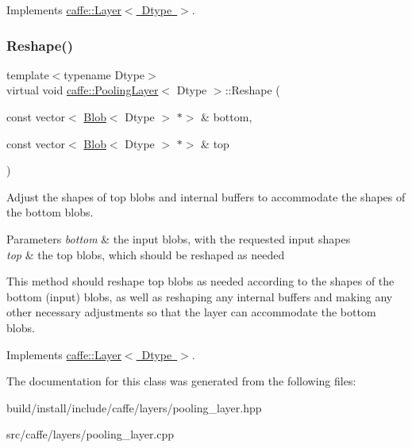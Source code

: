 Implements \mbox{\hyperlink{classcaffe_1_1_layer_a7fe981e8af8d93d587acf2a952be563d}{caffe\+::\+Layer$<$ Dtype $>$}}.

\mbox{\label{classcaffe_1_1_pooling_layer_ad8ab4e6541bc0954146d62781aeb1af8}} 
\subsubsection{\texorpdfstring{Reshape()}{Reshape()}\hspace{0.1cm}{\footnotesize\ttfamily [2/2]}}
{\footnotesize\ttfamily template$<$typename Dtype$>$ \\
virtual void \mbox{\hyperlink{classcaffe_1_1_pooling_layer}{caffe\+::\+Pooling\+Layer}}$<$ Dtype $>$\+::Reshape (\begin{DoxyParamCaption}\item[{const vector$<$ \mbox{\hyperlink{classcaffe_1_1_blob}{Blob}}$<$ Dtype $>$ $\ast$$>$ \&}]{bottom,  }\item[{const vector$<$ \mbox{\hyperlink{classcaffe_1_1_blob}{Blob}}$<$ Dtype $>$ $\ast$$>$ \&}]{top }\end{DoxyParamCaption})\hspace{0.3cm}{\ttfamily [virtual]}}



Adjust the shapes of top blobs and internal buffers to accommodate the shapes of the bottom blobs. 


\begin{DoxyParams}{Parameters}
{\em bottom} & the input blobs, with the requested input shapes \\
\hline
{\em top} & the top blobs, which should be reshaped as needed\\
\hline
\end{DoxyParams}
This method should reshape top blobs as needed according to the shapes of the bottom (input) blobs, as well as reshaping any internal buffers and making any other necessary adjustments so that the layer can accommodate the bottom blobs. 

Implements \mbox{\hyperlink{classcaffe_1_1_layer_a7fe981e8af8d93d587acf2a952be563d}{caffe\+::\+Layer$<$ Dtype $>$}}.



The documentation for this class was generated from the following files\+:\begin{DoxyCompactItemize}
\item 
build/install/include/caffe/layers/pooling\+\_\+layer.\+hpp\item 
src/caffe/layers/pooling\+\_\+layer.\+cpp\end{DoxyCompactItemize}
